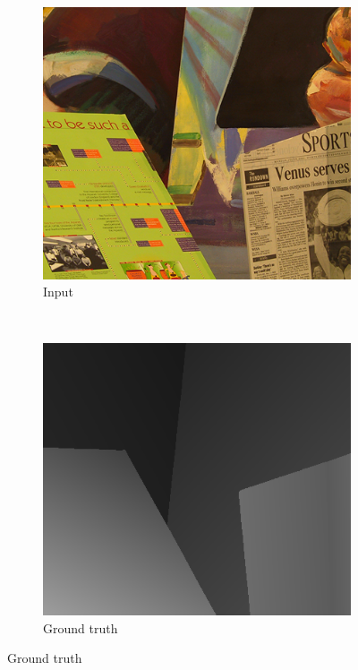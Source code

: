 \begin{figure}
  \setcounter{subfigure}{0}
  \label{fig:grid-of-outputs-venus}
  \centering



  \begin{subfigure}[b]{0.3\textwidth}
    \centering
    \includegraphics[width=\textwidth]{images/stereo-pairs/venus_imL.png}
    \caption{Input}
  \end{subfigure}
  ~
  \begin{subfigure}[b]{0.3\textwidth}
    \centering
    \includegraphics[width=\textwidth]{images/stereo-pairs/venus_groundtruth.png}
    \caption{Ground truth}
  \end{subfigure}


\end{figure}
